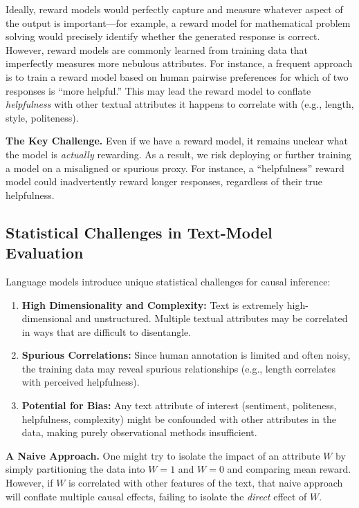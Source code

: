 Ideally, reward models would perfectly capture and measure whatever aspect of the output is important---for example, a reward model for mathematical problem solving would precisely identify whether the generated response is correct. However, reward models are commonly learned from training data that imperfectly measures more nebulous attributes. For instance, a frequent approach is to train a reward model based on human pairwise preferences for which of two responses is ``more helpful.'' This may lead the reward model to conflate \emph{helpfulness} with other textual attributes it happens to correlate with (e.g., length, style, politeness).

\textbf{The Key Challenge.} Even if we have a reward model, it remains unclear what the model is \emph{actually} rewarding. As a result, we risk deploying or further training a model on a misaligned or spurious proxy. For instance, a ``helpfulness'' reward model could inadvertently reward longer responses, regardless of their true helpfulness.

\subsection{Statistical Challenges in Text-Model Evaluation}
Language models introduce unique statistical challenges for causal inference:
\begin{enumerate}
    \item \textbf{High Dimensionality and Complexity:} Text is extremely high-dimensional and unstructured. Multiple textual attributes may be correlated in ways that are difficult to disentangle.
    \item \textbf{Spurious Correlations:} Since human annotation is limited and often noisy, the training data may reveal spurious relationships (e.g., length correlates with perceived helpfulness).
    \item \textbf{Potential for Bias:} Any text attribute of interest (sentiment, politeness, helpfulness, complexity) might be confounded with other attributes in the data, making purely observational methods insufficient.
\end{enumerate}

\textbf{A Naive Approach.} One might try to isolate the impact of an attribute $W$ by simply partitioning the data into $W=1$ and $W=0$ and comparing mean reward. However, if $W$ is correlated with other features of the text, that naive approach will conflate multiple causal effects, failing to isolate the \emph{direct} effect of $W$.

